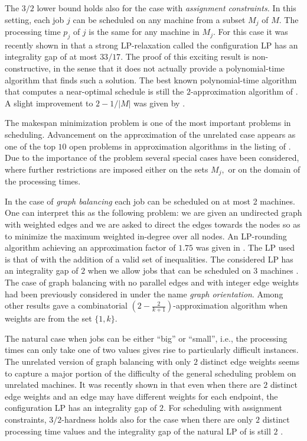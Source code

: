 \documentclass[11pt]{article}\usepackage{amsmath}
\begin{document}
The $3/2$  lower bound  holds also for  the case with  {\em assignment
  constraints.} In this setting, each  job $j$ can be scheduled on any
machine from a subset $M_j$ of  $M$. The processing time $p_j$ of $j$ is the
same for any machine in $M_j.$ 
For this case it was recently shown in \cite{svensson} that a strong
LP-relaxation called the configuration LP has an integrality gap of at
most  $33/17$.   The  proof   of  this  exciting   result  is
non-constructive, in  the sense  that it does  not actually  provide a
polynomial-time algorithm  that finds such a solution.  The best known
polynomial-time  algorithm that  computes a  near-optimal  schedule is
still the $2$-approximation algorithm of \cite{lenstra}. A slight improvement to
$2-1/|M|$ was given by \cite{ShchepinV05}. 

The  makespan  minimization  problem  is  one of  the  most  important
problems  in  scheduling.  Advancement  on the  approximation  of  the
unrelated  case  appears as  one  of the  top  $10$  open problems  in
approximation  algorithms in  the  listing of  \cite{sw}.  Due to  the
importance of the problem several special cases have been considered,
where further  restrictions are imposed  either on the sets  $M_j,$ or
on the domain of the processing times. 

 In the case of \emph{graph balancing} each job can be scheduled on at
 most  2  machines. One  can  interpret  this  as  the  following
 problem: we are given an undirected graph with weighted edges and we are asked to
 direct  the edges towards  the nodes  so as  to minimize  the maximum
 weighted in-degree over all nodes. An LP-rounding algorithm achieving
 an approximation factor of  $1.75$ was given in \cite{ebenlendr}. The
 LP  used is  that  of \cite{lenstra}  with  the addition  of a valid set of
  inequalities. The considered  LP has an integrality gap  of $2$ when we
 allow jobs that can be scheduled on $3$ machines \cite{svensson}. The
 case of graph balancing with no parallel edges and with integer edge
 weights had been previously considered in
 \cite{asa}  under  the  name  \emph{graph orientation}.  Among  other
 results         \cite{asa}        gave         a        combinatorial
 $(2-\frac{2}{k+1})$-approximation algorithm when weights are from the 
 set $\{1, k\}.$


The natural case when jobs can be either ``big'' or ``small'', i.e., the processing
times  can  only take one of two values gives
rise to particularly difficult instances.
The unrelated version of graph balancing with only $2$ distinct
edge weights seems to capture a major portion
of the difficulty of the general scheduling problem on unrelated machines.  It was
 recently shown in  \cite{jose} 
that even when  there are $2$ distinct edge weights and 
an  edge   may  have  different  weights  for   each  endpoint,  the
configuration  LP has  an  integrality gap  of  $2$. 
For scheduling with assignment constraints, 
$3/2$-hardness    holds also for 
the case when there are
only $2$  distinct processing time values \cite{lenstra} and  the  integrality  gap  of  the
natural LP of
\cite{lenstra}  is  still $2$ \cite{ebenlendr}.
\end{document}
